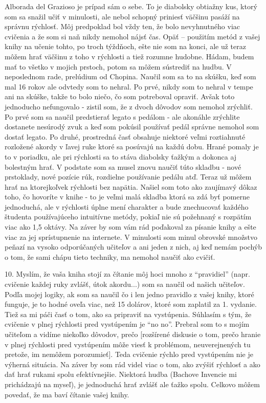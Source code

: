Alborada del Grazioso je prípad sám o sebe. To je diabolsky obtiažny kus, ktorý som sa snažil učiť v minulosti, ale nebol schopný priniesť väčšinu pasáží na správnu rýchlosť. Môj predpoklad bol vždy ten, že bolo nevyhnutného viac cvičenia a že som si naň nikdy nemohol nájsť čas. Opäť – použitím metód  z vašej knihy na učenie tohto, po troch týždňoch, ešte nie som na konci, ale už teraz môžem hrať väčšinu z toho v rýchlosti a tiež rozumne hudobne. Hádam, budem mať to všetko v mojich prstoch, potom sa môžem sústrediť na hudbu.
V neposlednom rade, prelúdium od Chopina. Naučil som sa to na skúšku, keď som mal 16 rokov ale odvtedy som to nehral. Po prvé, nikdy som to nehral v tempe ani na skúške, takže to bolo niečo, čo som potreboval opraviť. Avšak toto jednoducho nefungovalo - zistil som, že z dvoch dôvodov som nemohol zrýchliť. Po prvé som sa naučil predstierať legato s pedálom - ale akonáhle zrýchlite dostanete nesúrodý zvuk a keď som pokúsil používať pedál správne nemohol som dostať legato. Po druhé, prostredná časť obsahuje niektoré veľmi roztiahnuté rozložené akordy v ľavej ruke ktoré sa posúvajú na každú dobu. Hrané pomaly je to v poriadku, ale pri rýchlosti sa to stáva diabolsky ťažkým a dokonca aj bolestným hrať. V podstate som sa musel znovu naučiť túto skladbu - nové prstoklady, nové pozície rúk, rozdielne používanie pedálu atď. Teraz už môžem hrať na ktorejkoľvek rýchlosti bez napätia. Našiel som toto ako zaujímavý dôkaz toho, čo hovoríte v knihe - to je veľmi malá skladba ktorá sa zdá byť pomerne jednoduchá, ale v rýchlosti úplne mení charakter a bude znechucovať každého študenta používajúceho intuitívne metódy, pokiaľ nie sú požehnaný s rozpätím viac ako 1,5 oktávy.
Na záver by som vám rád poďakoval za písanie knihy a ešte viac za jej sprístupnenie na internete. V minulosti som minul obrovské množstvo peňazí na vysoko odporúčaných učiteľov a ani jeden z nich, aj keď nemám pochýb o tom, že sami chápu tieto techniky, ma nemohol naučiť ako cvičiť.
\medskip

10. Myslím, že vaša kniha stojí za čítanie môj hoci mnoho z “pravidiel” (napr. cvičenie každej ruky zvlášť, útok akordu...) som sa naučil od našich učiteľov. Podľa mojej logiky, ak som sa naučil čo i len jedno pravidlo z vašej knihy, ktoré funguje, je to hodné oveľa viac, než 15 dolárov, ktoré som zaplatil za 1. vydanie. Tiež sa mi páči časť o tom, ako sa pripraviť na vystúpenia. Súhlasím s tým, že cvičenie v plnej rýchlosti pred vystúpením je “no no”. Prebral som to s mojím učiteľom a vidíme niekoľko dôvodov, prečo [rozšírené diskusie o tom, prečo hranie v plnej rýchlosti pred vystúpením môže viesť k problémom, neuverejnených tu pretože, im nemôžem porozumieť]. Teda cvičenie rýchlo pred vystúpením nie je výherná situácia. Na záver by som rád videl viac o tom, ako zvýšiť rýchlosť a ako dať hrať rukami spolu efektívnejšie. Niektorá hudba (Bachove Invencie mi prichádzajú na myseľ), je jednoduchá hrať zvlášť ale ťažko spolu. Celkovo môžem povedať, že ma baví čítanie vašej knihy.
\medskip

